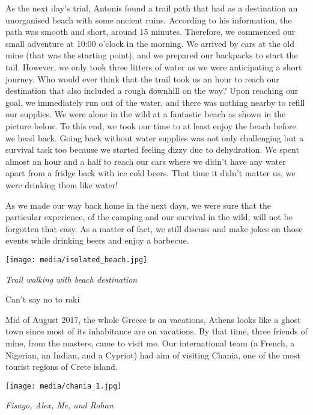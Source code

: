 \documentclass[10pt,a4paper]{article} %
\newcommand{\NewsItem}[1]{ %
\usefont{T1}{fvs}{n}{n} %
\vspace{24pt}\large #1\vspace{3pt} %
\par \normalsize \normalfont}
\begin{document}
\begin{multicols}{3}
As the next day's trial, Antonis found a trail path that had as a destination
an unorganised beach with some ancient ruins. 
According to his information, the path was smooth and short, around 15 minutes. 
Therefore, we commenced our small adventure at 10:00 o'clock in the morning. 
We arrived by cars at the old mine (that was the starting point),
and we prepared our backpacks to start the tail. 
However, we only took three litters of water as we were anticipating a short journey. 
Who would ever think that the trail took us an hour to reach our destination
that also included a rough downhill on the way?
Upon reaching our goal, we immediately run out of the water,
and there was nothing nearby to refill our supplies. 
We were alone in the wild at a fantastic beach as shown in the picture below. 
To this end, we took our time to at least enjoy the beach before we head back. 
Going back without water supplies was not only challenging but a survival task too
because we started feeling dizzy due to dehydration.   
We spent almost an hour and a half to reach our cars where
we didn't have any water apart from a fridge back with ice cold beers. 
That time it didn't matter us, we were drinking them like water! 

As we made our way back home in the next days,
we were sure that the particular experience,
of the camping and our survival in the wild, will not be forgotten that easy. 
As a matter of fact, we still discuss and make jokes on those events while 
drinking beers and enjoy a barbecue.

\begin{center}
	\texttt{[image: media/isolated\_beach.jpg]}
	\par\textit{Trail walking with beach destination}
\end{center}

\NewsItem{Can't say no to raki}
Mid of August 2017, the whole Greece is on vacations, Athens looks like a ghost 
town since most of its inhabitance are on vacations. 
By that time, three friends of mine, from the masters, came to visit me. 
Our international team (a French, a Nigerian, an Indian, and a Cypriot) had aim 
of visiting Chania, one of the most tourist regions of Crete island.   

\begin{center}
	\texttt{[image: media/chania\_1.jpg]}
	\par\textit{Fisayo, Alex, Me, and Rohan}
\end{center}


\end{multicols}
\end{document}
